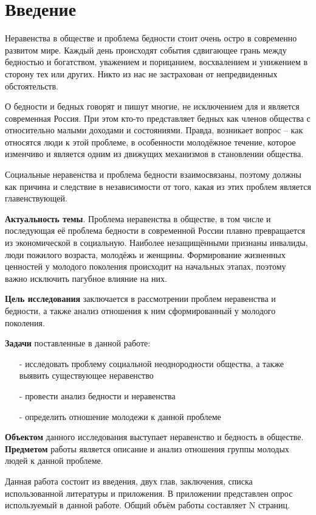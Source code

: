 \section*{Введение}

Неравенства в обществе и проблема бедности стоит очень остро в современно 
развитом мире. Каждый день происходят события сдвигающее грань между бедностью 
и богатством, уважением и порицанием, восхвалением и унижением в сторону тех 
или других. Никто из нас не застрахован от непредвиденных обстоятельств.

О бедности и бедных говорят и пишут многие, не исключением для и является 
современная Россия. При этом кто-то представляет бедных как членов общества с 
относительно малыми доходами и состояниями. Правда, возникает вопрос -- 
как относятся люди к этой проблеме, в особенности молодёжное течение, которое 
изменчиво и является одним из движущих механизмов в становлении общества.

Социальные неравенства и проблема бедности взаимосвязаны, поэтому должны как 
причина и следствие в независимости от того, какая из этих проблем является 
главенствующей.

\textbf{Актуальность темы}. Проблема неравенства в обществе, в том числе и 
последующая её проблема бедности в современной России плавно превращается из 
экономической в социальную. Наиболее незащищёнными признаны инвалиды, люди 
пожилого возраста, молодёжь и женщины. Формирование жизненных ценностей у 
молодого поколения происходит на начальных этапах, поэтому важно исключить 
пагубное влияние на них.

\textbf{Цель исследования} заключается в рассмотрении проблем неравенства и 
бедности, а также анализ отношения к ним сформированный у молодого поколения.  

\textbf{Задачи} поставленные в данной работе:
\begin{itemize}
    \item[-] исследовать проблему социальной неоднородности общества, а также 
        выявить существующее неравенство
    \item[-] провести анализ бедности и неравенства
    \item[-] определить отношение молодежи к данной проблеме
\end{itemize}

\textbf{Объектом} данного исследования выступает неравенство и бедность в 
обществе. \textbf{Предметом} работы является описание и анализ отношения 
группы молодых людей к данной проблеме.

Данная работа состоит из введения, двух глав, заключения, списка использованной 
литературы и приложения. В приложении представлен опрос используемый в данной 
работе. Общий объём работы составляет N страниц.

\newpage